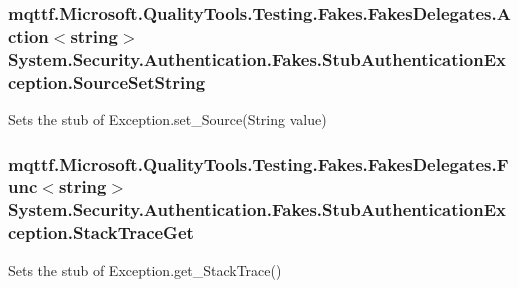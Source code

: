 \hypertarget{class_system_1_1_security_1_1_authentication_1_1_fakes_1_1_stub_authentication_exception_a707620d6068ec3ae1b4f90c3542060b1}{
\subsubsection[{Source\-Set\-String}]{\setlength{\rightskip}{0pt plus 5cm}mqttf.\-Microsoft.\-Quality\-Tools.\-Testing.\-Fakes.\-Fakes\-Delegates.\-Action$<$string$>$ System.\-Security.\-Authentication.\-Fakes.\-Stub\-Authentication\-Exception.\-Source\-Set\-String}}\label{class_system_1_1_security_1_1_authentication_1_1_fakes_1_1_stub_authentication_exception_a707620d6068ec3ae1b4f90c3542060b1}


Sets the stub of Exception.\-set\-\_\-\-Source(\-String value)

\hypertarget{class_system_1_1_security_1_1_authentication_1_1_fakes_1_1_stub_authentication_exception_a3423d65616aa854ac40a4941d0535edd}{
\subsubsection[{Stack\-Trace\-Get}]{\setlength{\rightskip}{0pt plus 5cm}mqttf.\-Microsoft.\-Quality\-Tools.\-Testing.\-Fakes.\-Fakes\-Delegates.\-Func$<$string$>$ System.\-Security.\-Authentication.\-Fakes.\-Stub\-Authentication\-Exception.\-Stack\-Trace\-Get}}\label{class_system_1_1_security_1_1_authentication_1_1_fakes_1_1_stub_authentication_exception_a3423d65616aa854ac40a4941d0535edd}


Sets the stub of Exception.\-get\-\_\-\-Stack\-Trace()

